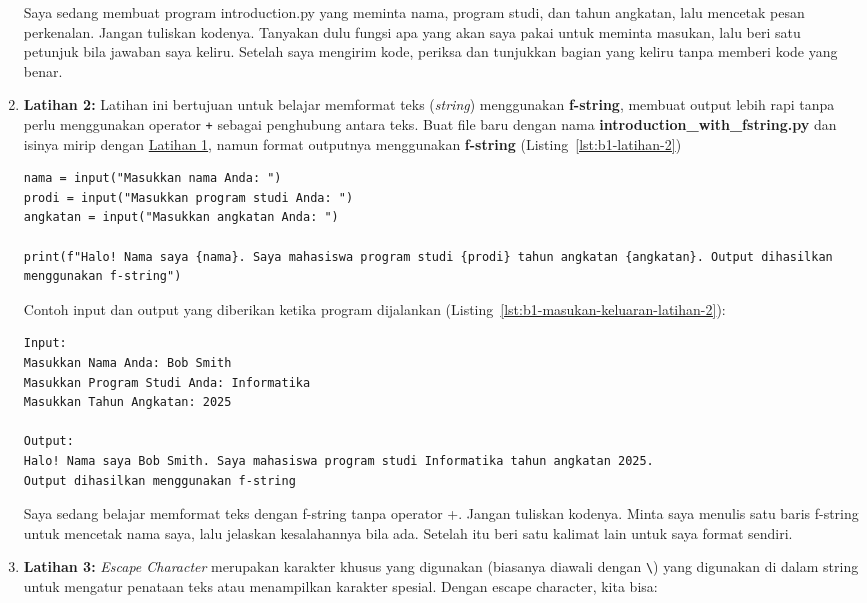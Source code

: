 \begin{enumerate}
  \begin{promptterarah}
  Saya sedang membuat program introduction.py yang meminta nama, program studi, dan tahun angkatan, lalu mencetak pesan perkenalan. Jangan tuliskan kodenya. Tanyakan dulu fungsi apa yang akan saya pakai untuk meminta masukan, lalu beri satu petunjuk bila jawaban saya keliru. Setelah saya mengirim kode, periksa dan tunjukkan bagian yang keliru tanpa memberi kode yang benar.
  \end{promptterarah}
\item \textbf{Latihan 2:} Latihan ini bertujuan untuk belajar memformat teks (\textit{string}) menggunakan \textbf{f-string}, membuat output lebih rapi tanpa perlu menggunakan operator \texttt{+} sebagai penghubung antara teks. Buat file baru dengan nama \textbf{introduction_with_fstring.py} dan isinya mirip dengan \hyperref[sec:first-exercise]{Latihan 1}, namun format outputnya menggunakan \textbf{f-string} (Listing~\ref{lst:b1-latihan-2})

\begin{lstlisting}[style=PythonStyle, caption={Latihan 2}, label={lst:b1-latihan-2}]
nama = input("Masukkan nama Anda: ")
prodi = input("Masukkan program studi Anda: ")
angkatan = input("Masukkan angkatan Anda: ")

print(f"Halo! Nama saya {nama}. Saya mahasiswa program studi {prodi} tahun angkatan {angkatan}. Output dihasilkan menggunakan f-string")
\end{lstlisting}

Contoh input dan output yang diberikan ketika program dijalankan (Listing~\ref{lst:b1-masukan-keluaran-latihan-2}):

\begin{lstlisting}[language=bash, caption={Contoh masukan dan keluaran Latihan 2}, label={lst:b1-masukan-keluaran-latihan-2}]
Input:
Masukkan Nama Anda: Bob Smith
Masukkan Program Studi Anda: Informatika
Masukkan Tahun Angkatan: 2025

Output:
Halo! Nama saya Bob Smith. Saya mahasiswa program studi Informatika tahun angkatan 2025.
Output dihasilkan menggunakan f-string
\end{lstlisting}

  \begin{promptterarah}
  Saya sedang belajar memformat teks dengan f-string tanpa operator +. Jangan tuliskan kodenya. Minta saya menulis satu baris f-string untuk mencetak nama saya, lalu jelaskan kesalahannya bila ada. Setelah itu beri satu kalimat lain untuk saya format sendiri.
  \end{promptterarah}
\item \textbf{Latihan 3:} \textit{Escape Character} merupakan karakter khusus yang digunakan (biasanya diawali dengan \texttt{\textbackslash}) yang digunakan di dalam string untuk mengatur penataan teks atau menampilkan karakter spesial. Dengan escape character, kita bisa:


\end{enumerate}
